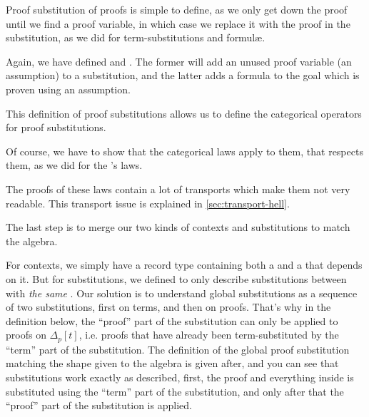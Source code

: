 \documentclass[10pt,a4paper]{article}
\begin{document}
			Proof substitution of proofs is simple to define, as we only get down the proof until we find a proof variable, in which case we replace it with the proof in the substitution, as we did for term-substitutions and formulæ.
			
			Again, we have defined  and . The former will add an unused proof variable (an assumption) to a substitution, and the latter adds a formula to the goal which is proven using an assumption.
		
			\begin{tcolorbox}
			\end{tcolorbox}
		
			This definition of proof substitutions allows us to define the categorical operators for proof substitutions. 
		
			Of course, we have to show that the categorical laws apply to them, that  respects them, as we did for the 's laws.
			
			The proofs of these laws contain a lot of transports which make them not very readable. This transport issue is explained in \autoref{sec:transport-hell}.
			
			\begin{tcolorbox}
				\agda{agda/FFOL-I-27.tex}
			\end{tcolorbox}
		
			The last step is to merge our two kinds of contexts and substitutions to match the algebra.
			
			For contexts, we simply have a record type containing both a  and a  that depends on it. But for substitutions, we defined  to only describe substitutions between  with \emph{the same }. Our solution is to understand global substitutions as a sequence of two substitutions, first on terms, and then on proofs. That's why in the definition below, the \enquote{proof} part of the substitution can only be applied to proofs on $\Delta_p [t]$, i.e. proofs that have already been term-substituted by the \enquote{term} part of the substitution. The definition of the global proof substitution matching the shape given to the algebra is given after, and you can see that substitutions work exactly as described, first, the proof and everything inside is substituted using the \enquote{term} part of the substitution, and only after that the \enquote{proof} part of the substitution is applied.
		
\end{document}
